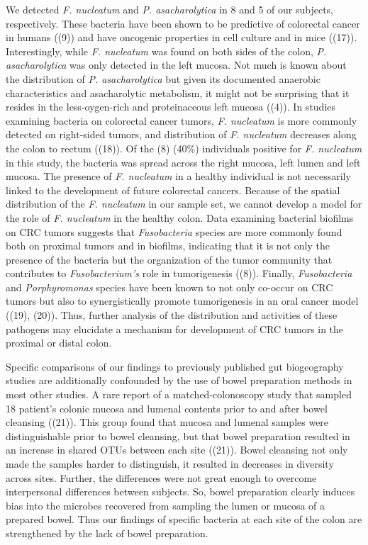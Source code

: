 \documentclass[11pt,]{article}
\begin{document}
We detected \emph{F. nucleatum} and \emph{P. asacharolytica} in 8 and 5
of our subjects, respectively. These bacteria have been shown to be
predictive of colorectal cancer in humans ((9)) and have oncogenic
properties in cell culture and in mice ((17)). Interestingly, while
\emph{F. nucleatum} was found on both sides of the colon, \emph{P.
asacharolytica} was only detected in the left mucosa. Not much is known
about the distribution of \emph{P. asacharolytica} but given its
documented anaerobic characteristics and asacharolytic metabolism, it
might not be surprising that it resides in the less-oygen-rich and
proteinaceous left mucosa ((4)). In studies examining bacteria on
colorectal cancer tumors, \emph{F. nucleatum} is more commonly detected
on right-sided tumors, and distribution of \emph{F. nucleatum} decreases
along the colon to rectum ((18)). Of the (8) (40\%) individuals positive
for \emph{F. nucleatum} in this study, the bacteria was spread across
the right mucosa, left lumen and left mucosa. The presence of \emph{F.
nucleatum} in a healthy individual is not necessarily linked to the
development of future colorectal cancers. Because of the spatial
distribution of the \emph{F. nucleatum} in our sample set, we cannot
develop a model for the role of \emph{F. nucleatum} in the healthy
colon. Data examining bacterial biofilms on CRC tumors suggests that
\emph{Fusobacteria} species are more commonly found both on proximal
tumors and in biofilms, indicating that it is not only the presence of
the bacteria but the organization of the tumor community that
contributes to \emph{Fusobacterium's} role in tumorigenesis ((8)).
Finally, \emph{Fusobacteria} and \emph{Porphyromonas} species have been
known to not only co-occur on CRC tumors but also to synergistically
promote tumorigenesis in an oral cancer model ((19), (20)). Thus,
further analysis of the distribution and activities of these pathogens
may elucidate a mechanism for development of CRC tumors in the proximal
or distal colon.

Specific comparisons of our findings to previously published gut
biogeography studies are additionally confounded by the use of bowel
preparation methods in most other studies. A rare report of a
matched-colonoscopy study that sampled 18 patient's colonic mucosa and
lumenal contents prior to and after bowel cleansing ((21)). This group
found that mucosa and lumenal samples were distinguishable prior to
bowel cleansing, but that bowel preparation resulted in an increase in
shared OTUs between each site ((21)). Bowel cleansing not only made the
samples harder to distinguish, it resulted in decreases in diversity
across sites. Further, the differences were not great enough to overcome
interpersonal differences between subjects. So, bowel preparation
clearly induces bias into the microbes recovered from sampling the lumen
or mucosa of a prepared bowel. Thus our findings of specific bacteria at
each site of the colon are strengthened by the lack of bowel
preparation.
\end{document}
